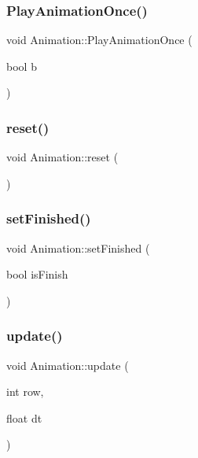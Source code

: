 \subsubsection{\texorpdfstring{PlayAnimationOnce()}{PlayAnimationOnce()}}
{\footnotesize\ttfamily void Animation\+::\+Play\+Animation\+Once (\begin{DoxyParamCaption}\item[{bool}]{b }\end{DoxyParamCaption})}

\mbox{\label{class_animation_a903eb4b61b8c7bc72bbedbdba4cbb501}} 
\subsubsection{\texorpdfstring{reset()}{reset()}}
{\footnotesize\ttfamily void Animation\+::reset (\begin{DoxyParamCaption}{ }\end{DoxyParamCaption})}

\mbox{\label{class_animation_ad9800ca0eaa9d3f811c81f01de8912d6}} 
\subsubsection{\texorpdfstring{setFinished()}{setFinished()}}
{\footnotesize\ttfamily void Animation\+::set\+Finished (\begin{DoxyParamCaption}\item[{bool}]{is\+Finish }\end{DoxyParamCaption})}

\mbox{\label{class_animation_a9d7263191a35959fa56b074ff7b9450a}} 
\subsubsection{\texorpdfstring{update()}{update()}}
{\footnotesize\ttfamily void Animation\+::update (\begin{DoxyParamCaption}\item[{int}]{row,  }\item[{float}]{dt }\end{DoxyParamCaption})}



